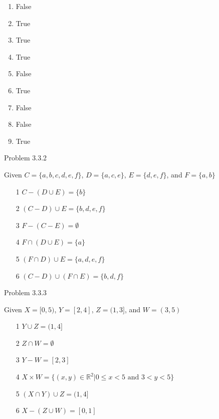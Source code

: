 \documentclass{article}
\theoremstyle{definition}
\newcommand{\R}{\mathbb{R}}
\begin{document}
	\begin{enumerate}
		\item False
		\item True
		\item True
		\item True
		\item False
		\item True
		\item False
		\item False
		\item True

	\end{enumerate}

	\vspace{1cm}



	\noindent Problem 3.3.2  \vspace{0.3cm}

	Given $C=\{a,b,c,d,e,f\}$, $D=\{a,c,e\}$, $E=\{d,e,f\}$, and
	$F=\{a,b\}$

	\begin{enumerate}
		\item[1] $C-(D\cup E)=\{b\}$
		\item[2] $(C-D)\cup E=\{b,d,e,f\}$
		\item[3] $F-(C-E)=\emptyset$
		\item[4] $F\cap (D\cup E)=\{a\}$
		\item[5] $(F\cap D)\cup E=\{a,d,e,f\}$
		\item[6] $(C-D)\cup (F\cap E)=\{b,d,f\}$

	\end{enumerate}

	\vspace{1cm}


	\noindent Problem 3.3.3  \vspace{0.3cm}

	Given $X=[0,5)$, $Y=[2,4]$, $Z=(1,3]$, and $W=(3,5)$

	\begin{enumerate}
		\item[1] $Y\cup Z=(1,4]$
		\item[2] $Z\cap W=\emptyset$
		\item[3] $Y-W=[2,3]$
		\item[4] $X\times W=\{(x,y)\in\R^2|0\le x<5\mbox{ and } 3<y<5\}$
		\item[5] $(X\cap Y)\cup Z=(1,4]$
		\item[6] $X-(Z\cup W)=[0,1]$

	\end{enumerate}
\end{document}
